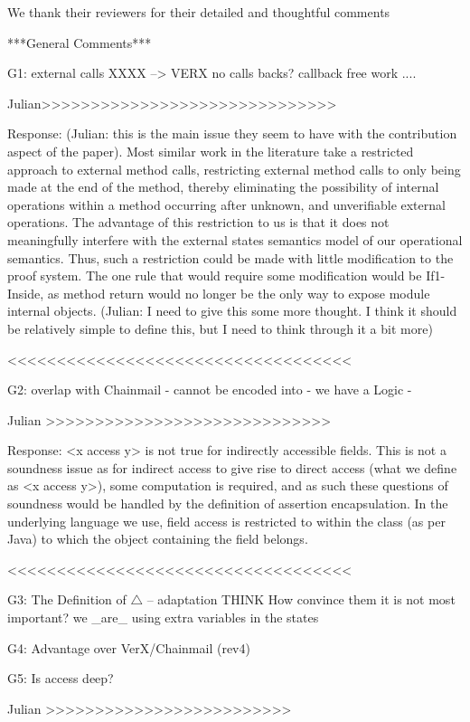 We thank their reviewers for their detailed and thoughtful comments 


***General Comments***

G1: external calls
XXXX
--> VERX no calls backs?
callback free work .... 

Julian>>>>>>>>>>>>>>>>>>>>>>>>>>>>>>

Response: (Julian: this is the main issue they seem to have with the contribution aspect of the paper). Most similar work in the literature take a restricted approach to external method calls, restricting external method calls to
only being made at the end of the method, thereby eliminating the possibility of internal operations within a method occurring after unknown, and unverifiable external operations. The advantage of this restriction to us is that
it does not meaningfully interfere with the external states semantics model of our operational semantics. Thus, such a restriction could be made with little modification to the proof system. The one rule that would require some modification would be If1-Inside, as method return would no longer be the only way to expose module internal objects.
(Julian: I need to give this some more thought. I think it should be relatively simple to define this, but I need to think through it a bit more)

<<<<<<<<<<<<<<<<<<<<<<<<<<<<<<<<<<<

G2:  overlap with Chainmail
- cannot be encoded into
- we have a Logic
- %

Julian >>>>>>>>>>>>>>>>>>>>>>>>>>>>>

Response: <x access y> is not true for indirectly accessible fields. This is not a soundness issue as for indirect access to give rise to direct access (what we define as <x access y>), some computation is required, and as such these questions of soundness would be handled by the definition of assertion encapsulation. In the underlying language we use, field access is restricted to within the class (as per Java) to which the object containing the field belongs.

<<<<<<<<<<<<<<<<<<<<<<<<<<<<<<<<<<<

G3: The Definition of $\triangle$ -- adaptation
THINK
How convince them it is not most important?
we _are_ using extra variables in the states

G4: Advantage over VerX/Chainmail (rev4)

G5: Is access deep?

Julian >>>>>>>>>>>>>>>>>>>>>>>>>

